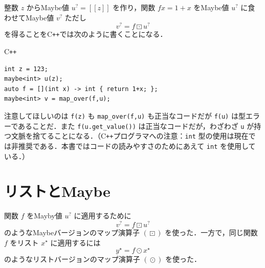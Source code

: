 \documentclass[a4paper]{jsbook}
\def\[{\left[\!\left[}
\def\]{\right]\!\right]}
\newcommand{\programminglanguage}[1]{\textsf{#1}}
\newcommand{\cxx}{\programminglanguage{C}\texttt{++}}
\newcommand{\code}[1]{\texttt{#1}}
\newenvironment{cxxcode}{\begin{itembox}[r]{\cxx}}{\end{itembox}}
\newcommand{\mMaybeWith}[1]{\[#1\]}
\newcommand{\mList}[1]{{#1}^\mathrm{\star}}
\newcommand{\mMaybe}[1]{{#1}^\text{?}}
\DeclareMathOperator{\mMapList}{\odot}
\DeclareMathOperator{\mMapMaybe}{\boxdot}
\begin{document}
整数 $z$ からMaybe値 $\mMaybe{u}=\mMaybeWith{z}$ を作り，関数 $fx=1+x$ をMaybe値 $\mMaybe{u}$ に食わせてMaybe値 $\mMaybe{v}$ ただし
\begin{equation}
\mMaybe{v}=f\mMapMaybe\mMaybe{u}
\end{equation}
を得ることを\cxx では次のように書くことになる．
\begin{cxxcode}
\begin{verbatim}
int z = 123;
maybe<int> u(z);
auto f = [](int x) -> int { return 1+x; };
maybe<int> v = map_over(f,u);
\end{verbatim}
\end{cxxcode}
注意してほしいのは \code{f(z)} も \code{map\_over(f,u)} も正当なコードだが \code{f(u)} は型エラーであることだ．また \code{f(u.get\_value())} は正当なコードだが，わざわざ \code{u} が持つ文脈を捨てることになる．（\cxx プログラマへの注意：\code{int} 型の使用は現在では非推奨である．本書ではコードの読みやすさのためにあえて \code{int} を使用している．）


\section{リストとMaybe}

関数 $f$ をMayby値 $\mMaybe{u}$ に適用するために
\begin{equation}
\mMaybe{v}=f\mMapMaybe\mMaybe{u}
\end{equation}
のようなMaybeバージョンのマップ演算子 $(\mMapMaybe)$ を使った．一方で，同じ関数 $f$ をリスト $\mList{x}$ に適用するには
\begin{equation}
\mList{y}=f\mMapList\mList{x}
\end{equation}
のようなリストバージョンのマップ演算子 $(\mMapList)$ を使った．
\end{document}

